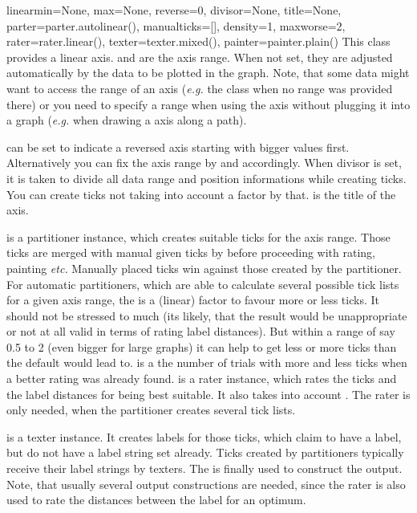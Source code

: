 \begin{classdesc}{linear}{min=None, max=None, reverse=0, divisor=None, title=None,
                          parter=parter.autolinear(), manualticks=[],
                          density=1, maxworse=2, rater=rater.linear(),
                          texter=texter.mixed(), painter=painter.plain()}
  This class provides a linear axis.  and  are the
  axis range. When not set, they are adjusted automatically by the
  data to be plotted in the graph. Note, that some data might want to
  access the range of an axis (\emph{e.g.} the  class
  when no range was provided there) or you need to specify a range
  when using the axis without plugging it into a graph (\emph{e.g.}
  when drawing a axis along a path).

   can be set to indicate a reversed axis starting with
  bigger values first. Alternatively you can fix the axis range by
   and  accordingly. When divisor is set, it is
  taken to divide all data range and position informations while
  creating ticks. You can create ticks not taking into account a
  factor by that.  is the title of the axis.

   is a partitioner instance, which creates suitable ticks
  for the axis range. Those ticks are merged with manual given ticks
  by  before proceeding with rating, painting
  \emph{etc.} Manually placed ticks win against those created by the
  partitioner. For automatic partitioners, which are able to calculate
  several possible tick lists for a given axis range, the
   is a (linear) factor to favour more or less ticks. It
  should not be stressed to much (its likely, that the result would be
  unappropriate or not at all valid in terms of rating label
  distances). But within a range of say 0.5 to 2 (even bigger for
  large graphs) it can help to get less or more ticks than the default
  would lead to.  is a the number of trials with more
  and less ticks when a better rating was already found. 
  is a rater instance, which rates the ticks and the label distances
  for being best suitable. It also takes into account .
  The rater is only needed, when the partitioner creates several tick
  lists.

   is a texter instance. It creates labels for those
  ticks, which claim to have a label, but do not have a label string
  set already. Ticks created by partitioners typically receive their
  label strings by texters. The  is finally used to
  construct the output. Note, that usually several output
  constructions are needed, since the rater is also used to rate the
  distances between the label for an optimum.
\end{classdesc}

